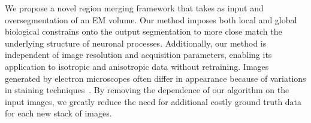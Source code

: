 We propose a novel region merging framework that takes as input and oversegmentation of an EM volume.
Our method imposes both local and global biological constrains onto the output segmentation to more close match the underlying structure of neuronal processes.
Additionally, our method is independent of image resolution and acquisition parameters, enabling its application to isotropic and anisotropic data without retraining.
Images generated by electron microscopes often differ in appearance because of variations in staining techniques~\cite{briggman2012volume}.
By removing the dependence of our algorithm on the input images, we greatly reduce the need for additional costly ground truth data for each new stack of images.
